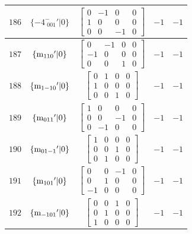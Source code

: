 \documentclass[fleqn,8pt]{jsarticle}
\begin{document}
\begin{longtable}{ccccc}
$ 186 $ & $ \{-4^{-}_{\,\,001}{}'|0\} $ & $ \begin{bmatrix} 0 & -1 & 0 & 0 \\ 1 & 0 & 0 & 0 \\ 0 & 0 & -1 & 0 \end{bmatrix} $ & $ -1 $ & $ -1 $ \\ \hline
$ 187 $ & $ \{{\rm m}_{110}{}'|0\} $ & $ \begin{bmatrix} 0 & -1 & 0 & 0 \\ -1 & 0 & 0 & 0 \\ 0 & 0 & 1 & 0 \end{bmatrix} $ & $ -1 $ & $ -1 $ \\ \hline
$ 188 $ & $ \{{\rm m}_{1-10}{}'|0\} $ & $ \begin{bmatrix} 0 & 1 & 0 & 0 \\ 1 & 0 & 0 & 0 \\ 0 & 0 & 1 & 0 \end{bmatrix} $ & $ -1 $ & $ -1 $ \\ \hline
$ 189 $ & $ \{{\rm m}_{011}{}'|0\} $ & $ \begin{bmatrix} 1 & 0 & 0 & 0 \\ 0 & 0 & -1 & 0 \\ 0 & -1 & 0 & 0 \end{bmatrix} $ & $ -1 $ & $ -1 $ \\ \hline
$ 190 $ & $ \{{\rm m}_{01-1}{}'|0\} $ & $ \begin{bmatrix} 1 & 0 & 0 & 0 \\ 0 & 0 & 1 & 0 \\ 0 & 1 & 0 & 0 \end{bmatrix} $ & $ -1 $ & $ -1 $ \\ \hline
$ 191 $ & $ \{{\rm m}_{101}{}'|0\} $ & $ \begin{bmatrix} 0 & 0 & -1 & 0 \\ 0 & 1 & 0 & 0 \\ -1 & 0 & 0 & 0 \end{bmatrix} $ & $ -1 $ & $ -1 $ \\ \hline
$ 192 $ & $ \{{\rm m}_{-101}{}'|0\} $ & $ \begin{bmatrix} 0 & 0 & 1 & 0 \\ 0 & 1 & 0 & 0 \\ 1 & 0 & 0 & 0 \end{bmatrix} $ & $ -1 $ & $ -1 $ \\
\end{longtable}
\end{document}
